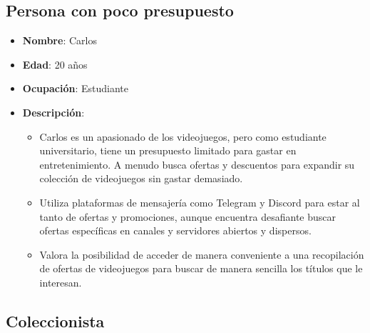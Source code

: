 \subsection{Persona con poco presupuesto}

\begin{itemize}
    \item \textbf{Nombre}: Carlos
    \item \textbf{Edad}: 20 años
    \item \textbf{Ocupación}: Estudiante
    \item \textbf{Descripción}:
    \begin{itemize}
        \item Carlos es un apasionado de los videojuegos, pero como estudiante 
        universitario, tiene un presupuesto limitado para gastar en 
        entretenimiento. A menudo busca ofertas y descuentos para expandir su 
        colección de videojuegos sin gastar demasiado.
        \item Utiliza plataformas de mensajería como Telegram y Discord para estar 
        al tanto de ofertas y promociones, aunque encuentra desafiante buscar 
        ofertas específicas en canales y servidores abiertos y dispersos.
        \item Valora la posibilidad de acceder de manera conveniente a una 
        recopilación de ofertas de videojuegos para buscar de manera sencilla los 
        títulos que le interesan.
    \end{itemize}
\end{itemize}

\subsection{Coleccionista}

